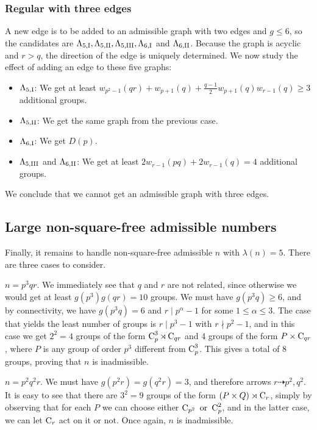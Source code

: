 \subsubsection*{Regular  with three edges}
A new edge is to be added to an admissible graph with two edges and $g \le 6$, so the candidates are $\Lambda_{5,\text{I}}, \Lambda_{5,\text{II}}, \Lambda_{5,\text{III}}, \Lambda_{6, \text{I}}$ and $\Lambda_{6, \text{II}}$.
Because the graph is acyclic and $r > q$, the direction of the edge is uniquely determined.
We now study the effect of adding an edge to these five graphs:
\begin{itemize}
	\item $\Lambda_{5,\text{I}}$: We get at least $w_{p^2 - 1}(qr) + w_{p + 1}(q) + \frac{q - 1}{2}w_{p + 1}(q)w_{r - 1}(q) \ge 3$ additional groups.
	\item $\Lambda_{5,\text{II}}$: We get the same graph from the previous case.
	\item $\Lambda_{6, \text{I}}$: We get $D(p)$.
	\item $\Lambda_{5,\text{III}}$ and $\Lambda_{6, \text{II}}$: We get at least $2w_{r - 1}(pq) + 2w_{r - 1}(q) = 4$ additional groups.
\end{itemize} \nopagebreak[4]
We conclude that we cannot get an admissible graph with three edges.


\subsection{Large non-square-free admissible numbers} 
Finally, it remains to handle non-square-free admissible $n$ with $\lambda(n) = 5$.
There are three cases to consider.

 $n = p^3 q r$.
We immediately see that $q$ and $r$ are not related, since otherwise we would get at least $g(p^3)g(qr) = 10$ groups.
We must have $g(p^3 q) \ge 6$, and by connectivity, we have $g(p^3 q) = 6$ and $r \mid p^\alpha - 1$ for some $1 \le \alpha \le 3$.
The case that yields the least number of groups is $r \mid p^3 - 1$ with $r \nmid p^2 - 1$, and in this case we get $2^2 = 4$ groups of the form $\operatorname{C}_{p}^3 \rtimes \operatorname{C}_{qr}$ and 4 groups of the form $P \times \operatorname{C}_{qr}$, where $P$ is any group of order $p^3$ different from $\operatorname{C}_{p}^3$.
This gives a total of 8 groups, proving that $n$ is inadmissible.

 $n = p^2 q^2 r$.
We must have $g(p^2 r) = g(q^2 r) = 3$, and therefore arrows $r \dashrightarrow p^2, q^2$.
It is easy to see that there are $3^2 = 9$ groups of the form $(P \times Q) \rtimes \operatorname{C}_{r}$, simply by observing that for each $P$ we can choose either $\operatorname{C}_{p^2}\text{ or }\operatorname{C}_{p}^2$, and in the latter case, we can let $\operatorname{C}_{r}$ act on it or not.
Once again, $n$ is inadmissible.
 
